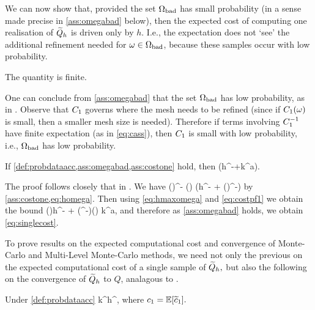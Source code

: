 We can now show that, provided the set $\Omega_{\mathrm{bad}}$ has small probability (in a sense made precise in \cref{ass:omegabad} below), then the expected cost of computing one realisation of $\widetilde{Q}_{h}$ is driven only by $h.$ I.e., the expectation does not `see' the additional refinement needed for $\omega \in \Omega_{\mathrm{bad}}$, because these samples occur with low probability.

\bas\label{ass:omegabad}
The quantity
\beq\label{eq:cass}
\cth \de {}
\eeq
is finite.
\eas

One can conclude from \cref{ass:omegabad} that the set $\Omega_{\mathrm{bad}}$ has low probability, as in \cite[Text at the bottom of p. 21]{GrScPa:19}. Observe that $C_{1}$ governs where the mesh needs to be refined (since if $C_{1}(\omega)$ is small, then a smaller mesh size is needed). Therefore if terms involving $C_{1}^{-1}$ have finite expectation (as in \cref{eq:cass}), then $C_{1}$ is small with low probability, i.e., $\Omega_{\mathrm{bad}}$ has low probability.

\label{lem:c}
If \cref{def:probdataacc,ass:omegabad,ass:costone} hold, then 
\beq\label{eq:singlecost}
\EXP{\Cost{\Qhtilde}} \leq \cth \mleft(h^{-\gamma}+k^{a\gamma}\mright).
\eeq
\ele

The proof follows closely that in \cite[Lemma 5.8]{GrPaSc:19}.
We have
\beq\label{eq:costpf1}
\Cost{\Qhtilde(\omega)} \leq \cthtilde(\omega)\homega^{-\gamma} \leq \cthtilde(\omega) \mleft(h^{-\gamma} + \mleft(\hmaxomega\mright)^{-\gamma}\mright)
\eeq
by \cref{ass:costone,eq:homega}. Then using \cref{eq:hmaxomega} and \cref{eq:costpf1} we obtain the bound
\beq\label{eq:costpf2}
\Cost{\Qhtilde(\omega)} \leq \cthtilde(\omega)h^{-\gamma} + \mleft(\cthtilde\Co^{-\gamma}\mright)(\omega) k^{a\gamma},
\eeq
and therefore as \cref{ass:omegabad} holds, we obtain \cref{eq:singlecost}.
\epf

To prove results on the expected computational cost and convergence of Monte-Carlo and Multi-Level Monte-Carlo methods, we need not only the previous  on the expected computational cost of a single sample of $\widetilde{Q}_{h},$ but also the following  on the convergence of $\widetilde{Q}_{h}$ to $Q$, analagous to \cite[Theorem 5.14]{GrPaSc:19}.

\label{ass:a}
Under \cref{def:probdataacc}
\beqs
{} \leq \co k^\sigma h^{\alpha},
\eeqs
where $\co = \EXP{\cotilde}.$
\ele

